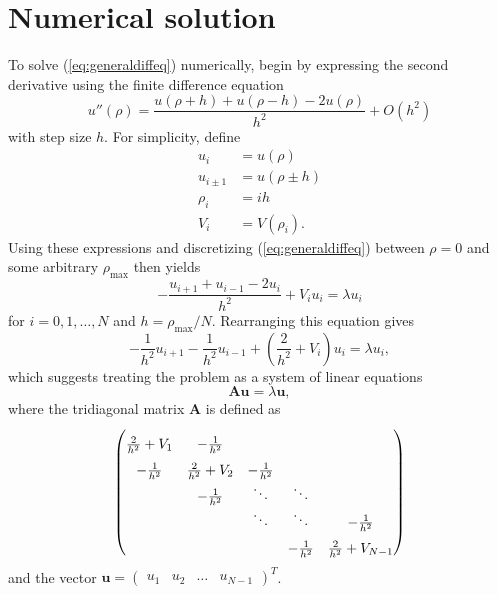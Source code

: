 \documentclass[aps,prc,reprint]{revtex4-1}
\begin{document}
\section{Numerical solution}
\label{sec:numsoln}
    To solve (\ref{eq:generaldiffeq}) numerically, begin by expressing the second derivative using the finite difference equation
    \begin{equation}
        u''(\rho) = \frac{u(\rho + h) + u(\rho - h) - 2u(\rho)}{h^2} + O(h^2)  \label{eq:findiff}
    \end{equation}
    with step size $h$. For simplicity, define
    \begin{align*}
        u_i         &= u(\rho)       \\
        u_{i \pm 1} &= u(\rho \pm h) \\
        \rho_i      &= ih            \\
        V_i         &= V(\rho_i).
    \end{align*}
    Using these expressions and discretizing (\ref{eq:generaldiffeq}) between $\rho = 0$ and some arbitrary $\rho_\text{max}$ then yields
    \begin{equation*}
        -\frac{u_{i+1} + u_{i-1} - 2u_i}{h^2} + V_i u_i = \lambda u_i
    \end{equation*}
    for $i=0,1,\dots,N$ and $h = \rho_\text{max} / N$. Rearranging this equation gives
    \begin{equation*}
        - \frac{1}{h^2} u_{i+1} - \frac{1}{h^2} u_{i-1} + \left(\frac{2}{h^2} + V_i\right)u_i = \lambda u_i,
    \end{equation*}
    which suggests treating the problem as a system of linear equations
    \begin{equation}
        \mathbf{A}\mathbf{u} = \lambda \mathbf{u},
    \end{equation}
    where the tridiagonal matrix $\mathbf{A}$ is defined as
    \begin{equation}
        \begin{pmatrix}
            \frac{2}{h^2}+V_1 & -\frac{1}{h^2}    &                &        & \vphantom{\ddots} \\
            -\frac{1}{h^2}    & \frac{2}{h^2}+V_2 & -\frac{1}{h^2} &        & \vphantom{\ddots} \\
                              & -\frac{1}{h^2}    & \ddots         & \ddots &                   \\
                              &                   & \ddots         & \ddots & -\frac{1}{h^2}    \\
            \vphantom{\ddots} &                   &             & -\frac{1}{h^2} & \frac{2}{h^2}+V_{N-1} \\
        \end{pmatrix}
    \end{equation}
    and the vector $\mathbf{u} = \begin{pmatrix}u_1 & u_2 & \dots & u_{N-1}\end{pmatrix}^T$.
\end{document}
